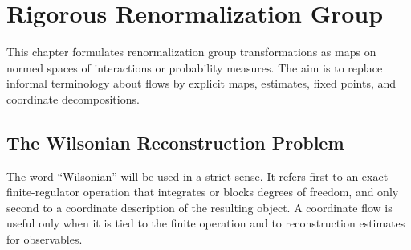 \chapter{Rigorous Renormalization Group}
\label{ch:volume-xi-rigorous-renormalization-group}
\label{ch:constructive-rigorous-renormalization-group}

\ConventionsEuclidean

This chapter formulates renormalization group transformations as maps on
normed spaces of interactions or probability measures.  The aim is to replace
informal terminology about flows by explicit maps, estimates, fixed points,
and coordinate decompositions.

\section{The Wilsonian Reconstruction Problem}

The word ``Wilsonian'' will be used in a strict sense.  It refers first to an
exact finite-regulator operation that integrates or blocks degrees of freedom,
and only second to a coordinate description of the resulting object.  A
coordinate flow is useful only when it is tied to the finite operation and to
reconstruction estimates for observables.


